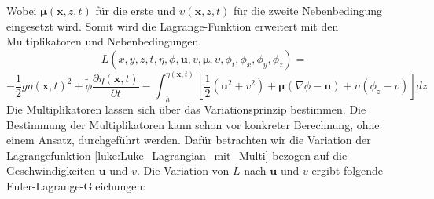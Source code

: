 Wobei $\bm{\mu}(\bm{x},z,t)$ für die erste und $\upsilon(\bm{x},z,t)$ für die zweite Nebenbedingung eingesetzt wird.
Somit wird die Lagrange-Funktion erweitert mit den Multiplikatoren und Nebenbedingungen.
\[
L(x,y,z,t,\eta,\phi,\bm{u}, v, \bm{\mu},\upsilon,\phi_t,\phi_x,\phi_y,\phi_z)
=
\]
\begin{equation}
	-
	\frac{1}{2} g \eta(\bm{x},t)^2
	+
	\widetilde{\phi} \frac{\partial\eta(\bm{x},t)}{\partial t}
	-
	\int_{-h}^{\eta(\bm{x},t)} \left[ \frac{1}{2} (\bm{u}^2 + v^2) + \bm{\mu} (\nabla\phi - \bm{u}) + \upsilon  \left(\phi_z - v\right) \right] dz
	\label{luke:Luke_Lagrangian_mit_Multi}
\end{equation}
Die Multiplikatoren lassen sich über das Variationsprinzip bestimmen.
Die Bestimmung der Multiplikatoren kann schon vor konkreter Berechnung, ohne einem Ansatz, durchgeführt werden.
Dafür betrachten wir die Variation der Lagrangefunktion \eqref{luke:Luke_Lagrangian_mit_Multi} bezogen auf die Geschwindigkeiten $\bm{u}$ und $v$.
Die Variation von $L$ nach $\bm{u}$ und $v$ ergibt folgende Euler-Lagrange-Gleichungen:

